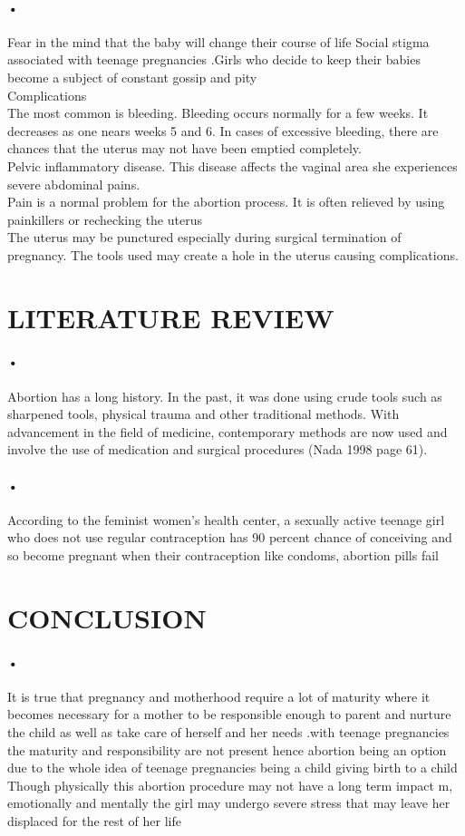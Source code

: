 \documentclass[12pt]{article}
\begin{document}
\paragraph{•}
Fear in the mind that the baby will change their course of life
Social stigma associated with teenage pregnancies .Girls who decide to keep their babies become a subject of constant gossip and pity\\
Complications\\
The most common is bleeding. Bleeding occurs normally for a few weeks. It decreases as one nears weeks 5 and 6. In cases of excessive bleeding, there are chances that the uterus may not have been emptied completely.\\
Pelvic inflammatory disease. This disease affects the vaginal area she experiences severe abdominal pains. \\
Pain is a normal problem for the abortion process. It is often relieved by using painkillers or rechecking the uterus\\
The uterus may be punctured especially during surgical termination of pregnancy. The tools used may create a hole in the uterus causing complications.


\section{LITERATURE REVIEW}
\paragraph{•}
Abortion has a long history. In the past, it was done using crude tools such as sharpened tools, physical trauma and other traditional methods. With advancement in the field of medicine, contemporary methods are now used and involve the use of medication and surgical procedures (Nada 1998 page 61).
\paragraph{•}
According to the feminist women’s health center, a sexually active teenage girl who does not use regular contraception has 90 percent chance of conceiving and so become pregnant when their contraception like condoms, abortion pills fail

\section{CONCLUSION}
\paragraph{•}
It is true that pregnancy and motherhood require a lot of maturity where it becomes necessary for a mother to be responsible enough to parent and nurture the child as well as take care of herself and her needs .with teenage pregnancies the maturity and responsibility are not present hence abortion being an option due to the whole idea of teenage pregnancies being a child giving birth to a child 
Though physically this abortion procedure may not have a long term impact m, emotionally and mentally the girl may undergo severe stress that may leave her displaced for the rest of her life
\end{document}
